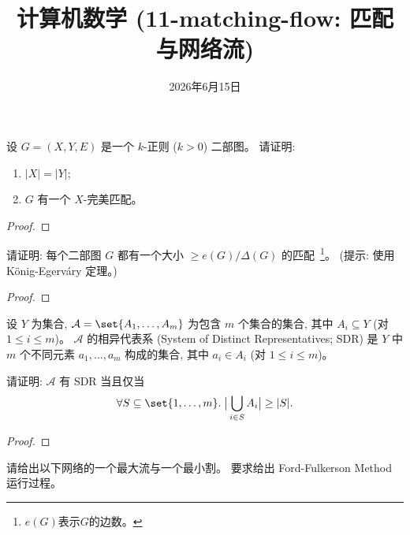 \documentclass[a4paper, justified]{tufte-handout}
\title{计算机数学 (11-matching-flow: 匹配与网络流)}
\date{2026年6月15日}
\begin{document}
\maketitle
\noplagiarism %
\begin{abstract}
\end{abstract}
\beginrequired

\begin{problem}
  设 $G = (X, Y, E)$ 是一个 $k$-正则 ($k > 0$) 二部图。
  请证明:
  \begin{enumerate}[(1)]
    \item $|X| = |Y|$;
    \item $G$ 有一个 $X$-完美匹配。
  \end{enumerate}
\end{problem}

\begin{proof}
\end{proof}

\begin{problem}
  请证明: 每个二部图 $G$ 都有一个大小 $\ge e(G)/\Delta(G)$ 的匹配~\footnote{$e(G)$表示$G$的边数。}。
  (提示: 使用 K\"{o}nig-Egerv\'{a}ry 定理。)
\end{problem}

\begin{proof}
\end{proof}

\begin{problem}
  设 $Y$ 为集合,
  $\mathcal{A} = \set{A_{1}, \dots, A_{m}}$
  为包含 $m$ 个集合的集合, 其中 $A_{i} \subseteq Y$ (对 $1 \le i \le m$)。
  $\mathcal{A}$ 的相异代表系 (System of Distinct Representatives; SDR)
  是 $Y$ 中 $m$ 个不同元素 $a_{1}, \dots, a_{m}$ 构成的集合,
  其中 $a_{i} \in A_{i}$ (对 $1 \le i \le m$)。

  \noindent 请证明: $\mathcal{A}$ 有 SDR 当且仅当
  \[
    \forall S \subseteq \set{1, \dots, m}.\;
      \big\lvert \bigcup_{i \in S} A_{i} \big\rvert \ge |S|.
  \]
\end{problem}

\begin{proof}
\end{proof}

\begin{problem}
  请给出以下网络的一个最大流与一个最小割。
  要求给出 Ford-Fulkerson Method 运行过程。
\end{problem}
\end{document}
